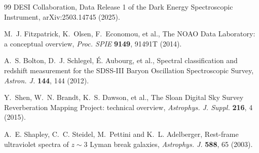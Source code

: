 \documentclass[3p,11pt]{elsarticle}
\begin{document}
\begin{thebibliography}{99}
DESI Collaboration, Data Release 1 of the Dark Energy Spectroscopic Instrument,
arXiv:2503.14745 (2025).

M.~J. Fitzpatrick, K.~Olsen, F.~Economou, et al., The NOAO Data Laboratory: a conceptual
overview, \emph{Proc. SPIE} \textbf{9149}, 91491T (2014).

A.~S. Bolton, D.~J. Schlegel, \'E. Aubourg, et al., Spectral classification and redshift
measurement for the SDSS-III Baryon Oscillation Spectroscopic Survey, \emph{Astron. J.}
\textbf{144}, 144 (2012).

Y.~Shen, W.~N. Brandt, K.~S. Dawson, et al., The Sloan Digital Sky Survey Reverberation
Mapping Project: technical overview, \emph{Astrophys. J. Suppl.} \textbf{216}, 4 (2015).

A.~E. Shapley, C.~C. Steidel, M.~Pettini and K.~L. Adelberger, Rest-frame ultraviolet
spectra of $z\sim3$ Lyman break galaxies, \emph{Astrophys. J.} \textbf{588}, 65 (2003).

\end{thebibliography}
\end{document}
